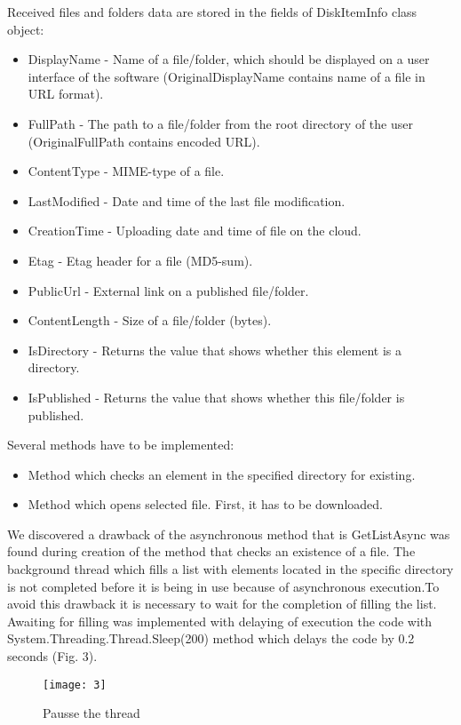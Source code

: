 \documentclass[12pt,journal,compsoc]{D:/Магистратура/English/bare_conf/IEEEtran}
\begin{document}
Received files and folders data are stored in the fields of DiskItemInfo class object:
\begin{itemize}
\item DisplayName - Name of a file/folder, which should be displayed on a user interface of the software (OriginalDisplayName contains name of a file in URL format).
\item FullPath - The path to a file/folder from the root directory of the user (OriginalFullPath contains encoded URL).
\item ContentType - MIME-type of a file.
\item LastModified - Date and time of the last file modification.
\item CreationTime - Uploading date and time of file on the cloud.
\item Etag - Etag header for a file (MD5-sum).
\item PublicUrl - External link on a published file/folder.
\item ContentLength - Size of a file/folder (bytes).
\item IsDirectory - Returns the value that shows whether this element is a directory.
\item IsPublished - Returns the value that shows whether this file/folder is published.
\end{itemize}

Several methods have to be implemented:
\begin{itemize}
\item Method which checks an element in the specified directory for existing.
\item Method which opens selected file. First, it has to be downloaded.
\end{itemize}

We discovered a drawback of the asynchronous method that is GetListAsync was found during creation of the method that checks an existence of a file. The background thread which fills a  list with elements located in the specific directory is not completed before it is being in use because of asynchronous execution.To avoid this drawback it is necessary to wait for the completion of filling the list. Awaiting for filling was implemented with delaying of execution the code with System.Threading.Thread.Sleep(200) method which delays the code by 0.2 seconds (Fig. 3).
\begin{figure}[h]
\centering
\texttt{[image: 3]}
\centering
\caption{Pausse the thread}
\end{figure}
\end{document}
